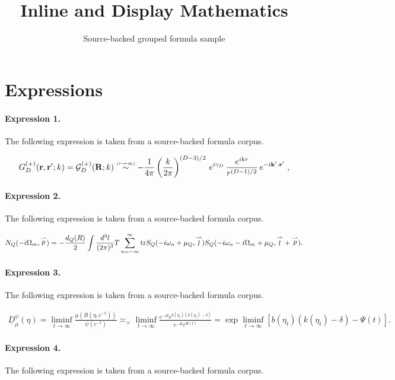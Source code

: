 \documentclass[11pt]{article}
\title{Inline and Display Mathematics}
\author{Source-backed grouped formula sample}
\date{}
\begin{document}
\maketitle
\section{Expressions}
\paragraph{Expression 1.} The following expression is taken from a source-backed formula corpus.

\begin{align*}G^{(+)}_{{D}}({\bf r}, {\bf r}';k)={\mathcal G}^{(+)}_{{D}}({\bf R};k) \stackrel{\scriptscriptstyle(r \rightarrow \infty)}{\sim}- \frac{1}{4\pi}\left( \frac{k}{2 \pi} \right)^{({D}-3)/2}\, e^{i\gamma_{{D}}}\,\frac{e^{ikr}}{r^{({D} -1)/2}} \, e^{-i {\bf k}' \cdot {\bf r}'}\; ,\end{align*}

\paragraph{Expression 2.} The following expression is taken from a source-backed formula corpus.

\begin{align*}N_{Q}(-i\Omega_m, \stackrel{\rightharpoonup}{p})=-\frac{d_Q(R)}{2}\int \frac{d^3l}{(2\pi)^3} T\sum_{n=-\infty}^{\infty}{\rm tr} S_Q(-i\omega_n+\mu_Q, \stackrel{\rightharpoonup}{l}) S_Q(-i\omega_n-i\Omega_m+\mu_Q, \stackrel{\rightharpoonup}{l} + \stackrel{\rightharpoonup}{p}).\end{align*}

\paragraph{Expression 3.} The following expression is taken from a source-backed formula corpus.

\begin{align*}\underline D_\mu^\psi(\eta) = \liminf_{t\to\infty} \frac{\mu(B(\eta,e^{-t}))}{\psi(e^{-t})}\asymp_\times \liminf_{t\to\infty} \frac{e^{-\delta t} e^{b(\eta_t)(k(\eta_t) - \delta)}}{e^{-\delta t} e^{\Psi(t)}}= \exp\liminf_{t\to\infty} [b(\eta_t)(k(\eta_t) - \delta) - \Psi(t)].\end{align*}

\paragraph{Expression 4.} The following expression is taken from a source-backed formula corpus.
\end{document}
